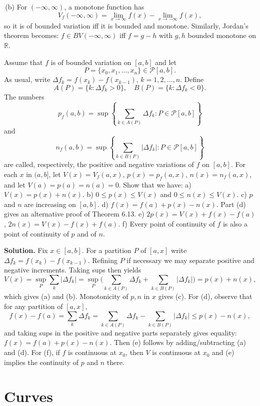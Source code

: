 \,(b) For $(-\infty,\infty)$, a monotone function has
\[V_f(-\infty,\infty)=\lim_{x\to\infty}f(x)-\lim_{x\to-\infty}f(x),\]
so it is of bounded variation iff it is bounded and monotone. Similarly, Jordan’s theorem becomes: $f\in BV(-\infty,\infty)$ iff $f=g-h$ with $g,h$ bounded monotone on $\mathbb{R}$.

\begin{problembox}
Assume that $f$ is of bounded variation on $[a, b]$ and let
\[P = \{x_0, x_1, \ldots, x_n\} \in \mathcal{P}[a, b].\]
As usual, write $\Delta f_k = f(x_k) - f(x_{k-1})$, $k = 1, 2, \ldots, n$. Define
\[A(P) = \{k : \Delta f_k > 0\}, \quad B(P) = \{k : \Delta f_k < 0\}.\]
The numbers
\[p_f(a, b) = \sup \left\{ \sum_{k \in A(P)} \Delta f_k : P \in \mathcal{P}[a, b] \right\}\]
and
\[n_f(a, b) = \sup \left\{ \sum_{k \in B(P)} |\Delta f_k| : P \in \mathcal{P}[a, b] \right\}\]
are called, respectively, the positive and negative variations of $f$ on $[a, b]$. For each $x$ in $(a, b]$, let $V(x) = V_f(a, x)$, $p(x) = p_f(a, x)$, $n(x) = n_f(a, x)$, and let $V(a) = p(a) = n(a) = 0$. Show that we have:
a) $V(x) = p(x) + n(x)$.
b) $0 \leq p(x) \leq V(x)$ and $0 \leq n(x) \leq V(x)$.
c) $p$ and $n$ are increasing on $[a, b]$.
d) $f(x) = f(a) + p(x) - n(x)$. Part (d) gives an alternative proof of Theorem 6.13.
e) $2p(x) = V(x) + f(x) - f(a)$, $2n(x) = V(x) - f(x) + f(a)$.
f) Every point of continuity of $f$ is also a point of continuity of $p$ and of $n$.
\end{problembox}

\noindent\textbf{Solution.}
Fix $x\in[a,b]$. For a partition $P$ of $[a,x]$ write $\Delta f_k=f(x_k)-f(x_{k-1})$. Refining $P$ if necessary we may separate positive and negative increments. Taking sups then yields
\[V(x)=\sup_P\sum_k |\Delta f_k|=\sup_P\Big(\sum_{k\in A(P)}\!\Delta f_k+\sum_{k\in B(P)}\!|\Delta f_k|\Big)=p(x)+n(x),\]
which gives (a) and (b). Monotonicity of $p,n$ in $x$ gives (c). For (d), observe that for any partition of $[a,x]$,
\[f(x)-f(a)=\sum_k \Delta f_k=\sum_{k\in A(P)}\!\Delta f_k-\sum_{k\in B(P)}\!|\Delta f_k|\le p(x)-n(x),\]
and taking sups in the positive and negative parts separately gives equality: $f(x)=f(a)+p(x)-n(x)$. Then (e) follows by adding/subtracting (a) and (d). For (f), if $f$ is continuous at $x_0$, then $V$ is continuous at $x_0$ and (e) implies the continuity of $p$ and $n$ there.

\section{Curves}

